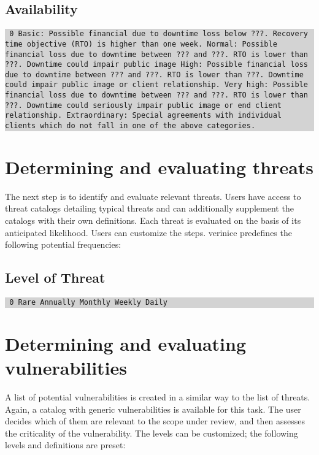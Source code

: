 \documentclass[a4paper,10pt]{book}
\begin{document}
\subsection{Availability}
\colorbox{lightgray}{\parbox{\textwidth}{
{\tt
0 Basic: Possible financial due to downtime loss below ???. Recovery time
objective (RTO) is higher than one week.
\newline{} Normal: Possible financial loss due to downtime between ??? and ???. RTO is
lower than ???. Downtime could impair public image
\newline{} High: Possible financial loss due to downtime between ??? and ???. RTO is
lower than ???. Downtime could impair public image or client relationship.
\newline{} Very high: Possible financial loss due to downtime between ??? and ???. RTO
is lower than ???. Downtime could seriously impair public image or end client
relationship.
\newline{} Extraordinary: Special agreements with individual clients which do not fall
in one of the above categories.}
}}

\section{Determining and evaluating threats}
The next step is to identify and evaluate relevant threats. Users have access to threat catalogs
detailing typical threats and can additionally supplement the catalogs with their own definitions.
Each threat is evaluated on the basis of its anticipated likelihood. Users can customize the steps.
verinice predefines the following potential frequencies:

\subsection{Level of Threat}
\colorbox{lightgray}{\parbox{\textwidth}{
{\tt
0 Rare  Annually  Monthly  Weekly  Daily}
}}

\section{Determining and evaluating vulnerabilities}
A list of potential vulnerabilities is created in a similar way to the list of threats. Again, a catalog
with generic vulnerabilities is available for this task. The user decides which of them are relevant to the
scope under review, and then assesses the criticality of the vulnerability. The levels can be customized;
the following levels and definitions are preset:
\end{document}
